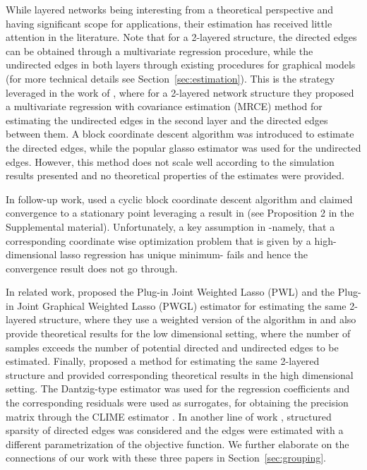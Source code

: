 While layered networks being interesting from a theoretical perspective and having significant scope for applications, 
their estimation has received little attention in the literature. 
Note that for a 2-layered structure, the directed edges can be obtained through a multivariate regression procedure, while
the undirected edges in both layers through existing procedures for graphical models (for more technical details see Section~\ref{sec:estimation}). This is the strategy leveraged in the work of \citet{rothman2010sparse}, where for a 2-layered network structure they proposed a multivariate regression with covariance estimation (MRCE) method for estimating the undirected edges in the second layer and the directed edges between them. A block coordinate
descent algorithm was introduced to estimate the directed edges, while the popular glasso estimator \citep{friedman2008sparse} was used for the undirected edges. However, this method does not scale well according to the simulation results presented and 
no theoretical properties of the estimates were provided. 

In follow-up work, \citet{yin2011sparse} used a cyclic block coordinate descent algorithm and claimed convergence to a stationary point leveraging a result in \citet{tseng2001convergence} (see Proposition 2 in the Supplemental material). Unfortunately,
a key assumption in \citet{tseng2001convergence} -namely, that a corresponding coordinate wise optimization problem that
is given by a high-dimensional lasso regression has unique minimum- fails and hence the convergence result does not go through.

In related work, \citet{lee2012simultaneous}
proposed the Plug-in Joint Weighted Lasso (PWL) and the Plug-in Joint Graphical Weighted Lasso (PWGL) estimator for estimating the same 2-layered structure, where they use a weighted version of the algorithm in \citet{rothman2010sparse} and also provide theoretical results for the low dimensional setting, where the number of samples exceeds the number of potential directed and undirected edges to be estimated.  Finally, \citet{cai2012covariate} proposed a method for estimating the same 2-layered structure and provided corresponding theoretical results in the high dimensional setting. The Dantzig-type estimator \citep{candes2007dantzig} was used for the regression coefficients and the corresponding residuals were used as surrogates, for obtaining the precision matrix through the CLIME estimator \citep{cai2011constrained}. In another line of work \citep{sohn2012joint,yuan2014partial,mccarter2014sparse}, structured sparsity of directed edges was considered and the edges were estimated with a different parametrization
of the objective function. We further elaborate on the connections of our work with these three papers in
Section~\ref{sec:grouping}.

